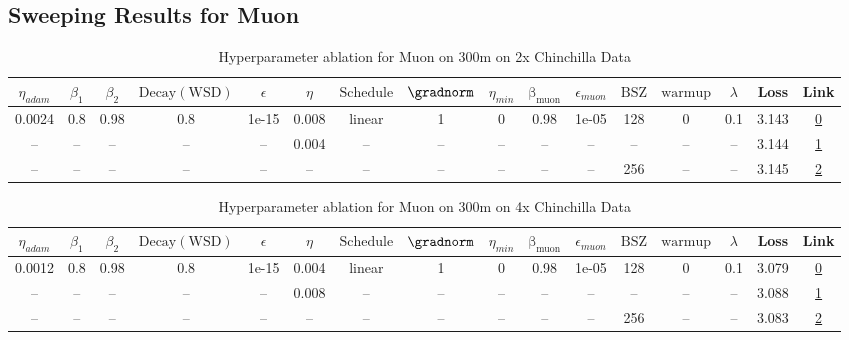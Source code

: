 \subsection{Sweeping Results for Muon}%
\begin{table}[H]
\centering
\caption{Hyperparameter ablation for Muon on 300m on 2x Chinchilla Data}
\label{tab:ablation_muon_300m_on_2x_chinchilla_data}
\begin{tabular}{cccccccccccccccc}
\toprule
$\eta_{adam}$ & $\beta_1$ & $\beta_2$ & $\mathrm{Decay (WSD)}$ & $\epsilon$ & $\eta$ & $\mathrm{Schedule}$ & $\gradnorm$ & $\eta_{min}$ & $\mathrm{\beta_{muon}}$ & $\epsilon_{muon}$ & $\mathrm{BSZ}$ & $\mathrm{warmup}$ & $\lambda$ & Loss & Link \\
\midrule
0.0024 & 0.8 & 0.98 & 0.8 & 1e-15 & 0.008 & linear & 1 & 0 & 0.98 & 1e-05 & 128 & 0 & 0.1 & 3.143 & \href{https://wandb.ai/stanford-mercury/optimizer-scaling/runs/sweep-300m-12B-muon5de1eclr0.008-wd0.1-minlr0-warmup0-b10.8-b20.-049a9e}{0} \\
\midrule
-- & -- & -- & -- & -- & 0.004 & -- & -- & -- & -- & -- & -- & -- & -- & 3.144 & \href{https://wandb.ai/stanford-mercury/optimizer-scaling/runs/sweep-300m-12B-muon3a0740lr0.004-wd0.1-minlr0-warmup0-b10.8-b20.-732319}{1} \\
-- & -- & -- & -- & -- & -- & -- & -- & -- & -- & -- & 256 & -- & -- & 3.145 & \href{https://wandb.ai/stanford-mercury/optimizer-scaling/runs/sweep-300m-12B-muon103aa7lr0.008-wd0.1-minlr0-warmup0-b10.8-b20.-2cbfa9}{2} \\
\bottomrule
\end{tabular}
\end{table}

\begin{table}[H]
\centering
\caption{Hyperparameter ablation for Muon on 300m on 4x Chinchilla Data}
\label{tab:ablation_muon_300m_on_4x_chinchilla_data}
\begin{tabular}{cccccccccccccccc}
\toprule
$\eta_{adam}$ & $\beta_1$ & $\beta_2$ & $\mathrm{Decay (WSD)}$ & $\epsilon$ & $\eta$ & $\mathrm{Schedule}$ & $\gradnorm$ & $\eta_{min}$ & $\mathrm{\beta_{muon}}$ & $\epsilon_{muon}$ & $\mathrm{BSZ}$ & $\mathrm{warmup}$ & $\lambda$ & Loss & Link \\
\midrule
0.0012 & 0.8 & 0.98 & 0.8 & 1e-15 & 0.004 & linear & 1 & 0 & 0.98 & 1e-05 & 128 & 0 & 0.1 & 3.079 & \href{https://wandb.ai/stanford-mercury/optimizer-scaling/runs/sweep-300m-24B-muon25115alr0.004-wd0.1-minlr0-warmup0-b10.8-b20.-f7ddef}{0} \\
\midrule
-- & -- & -- & -- & -- & 0.008 & -- & -- & -- & -- & -- & -- & -- & -- & 3.088 & \href{https://wandb.ai/stanford-mercury/optimizer-scaling/runs/sweep-300m-24B-muond28b65lr0.008-wd0.1-minlr0-warmup0-b10.8-b20.-55461d}{1} \\
-- & -- & -- & -- & -- & -- & -- & -- & -- & -- & -- & 256 & -- & -- & 3.083 & \href{https://wandb.ai/stanford-mercury/optimizer-scaling/runs/sweep-300m-24B-muon3a0740lr0.004-wd0.1-minlr0-warmup0-b10.8-b20.-e71893}{2} \\
\bottomrule
\end{tabular}
\end{table}

